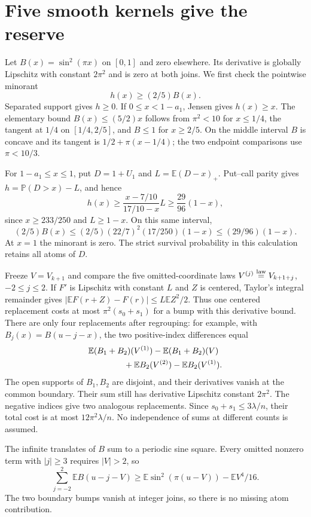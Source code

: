 \documentclass[11pt]{article}
\newcommand{\E}{\mathbb E}\newcommand{\Pp}{\mathbb P}
\begin{document}
\section{Five smooth kernels give the reserve}
Let $B(x)=\sin^2(\pi x)$ on $[0,1]$ and zero elsewhere. Its derivative
is globally Lipschitz with constant $2\pi^2$ and is zero at both joins.
We first check the pointwise minorant
\begin{equation}\label{eq:minorant} h(x)\ge(2/5)B(x).
\end{equation}
Separated support gives $h\ge0$. If $0\le x<1-a_1$, Jensen gives
$h(x)\ge x$. The elementary bound $B(x)\le(5/2)x$ follows from
$\pi^2<10$ for $x\le1/4$, the tangent at $1/4$ on $[1/4,2/5]$, and
$B\le1$ for $x\ge2/5$. On the middle interval $B$ is concave and its
tangent is $1/2+\pi(x-1/4)$; the two endpoint comparisons use $\pi<10/3$.

For $1-a_1\le x\le1$, put $D=1+U_1$ and $L=\E(D-x)_+$.
Put--call parity gives $h=\Pp(D>x)-L$, and hence
\[
 h(x)\ge\frac{x-7/10}{17/10-x}L
       \ge\frac{29}{96}(1-x),
\]
since $x\ge233/250$ and $L\ge1-x$. On this same interval,
\[
 (2/5)B(x)\le(2/5)(22/7)^2(17/250)(1-x)
                                    \le(29/96)(1-x).
\]
At $x=1$ the minorant is zero. The strict survival probability in this
calculation retains all atoms of $D$.

Freeze $V=V_{k+1}$ and compare the five omitted-coordinate laws
$V^{(j)}\stackrel{\rm law}=V_{k+1+j}$, $-2\le j\le2$.
If $F'$ is Lipschitz with constant $L$ and $Z$ is centered, Taylor's
integral remainder gives
$|\E F(r+Z)-F(r)|\le L\E Z^2/2$. Thus one centered replacement
costs at most $\pi^2(s_0+s_1)$ for a bump with this derivative bound.
There are only four replacements after regrouping: for example, with
$B_j(x)=B(u-j-x)$, the two positive-index differences equal
\begin{align*}
 &\E(B_1+B_2)(V^{(1)})-\E(B_1+B_2)(V)\\
 &\hspace{15mm}+\E B_2(V^{(2)})-\E B_2(V^{(1)}).
\end{align*}
The open supports of $B_1,B_2$ are disjoint, and their derivatives
vanish at the common boundary. Their sum still has derivative Lipschitz
constant $2\pi^2$. The negative indices give two analogous replacements.
Since $s_0+s_1\le3\lambda/n$, their total cost is at most
$12\pi^2\lambda/n$. No independence of sums at different counts is assumed.

The infinite translates of $B$ sum to a periodic sine square. Every
omitted nonzero term with $|j|\ge3$ requires $|V|>2$, so
\[
 \sum_{j=-2}^2\E B(u-j-V)
 \ge\E\sin^2(\pi(u-V))-\E V^4/16.
\]
The two boundary bumps vanish at integer joins, so there is no missing
atom contribution.
\end{document}
